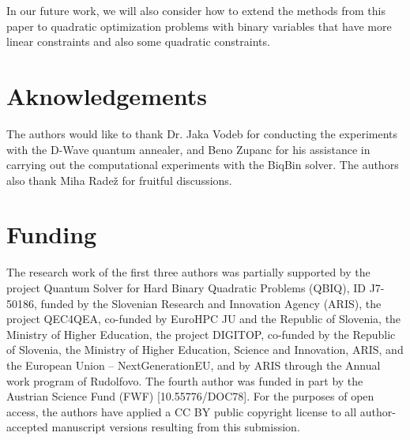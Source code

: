 \documentclass{article}
\begin{document}
In our future work, we will also consider how to extend the methods from this paper to quadratic optimization problems with binary variables that have more linear constraints and also some quadratic constraints.


\section*{Aknowledgements}
The authors would like to thank Dr. Jaka Vodeb for conducting the experiments with the D-Wave quantum annealer, and Beno Zupanc for his assistance in carrying out the computational experiments with the BiqBin solver. The authors also thank Miha Rade\v{z} for fruitful discussions.


\section*{Funding} The research work of the first three authors was partially supported by the project Quantum Solver for Hard Binary Quadratic Problems (QBIQ), ID J7-50186,  funded by the Slovenian Research and Innovation Agency (ARIS), the project QEC4QEA, co-funded by EuroHPC JU and the Republic of Slovenia, the Ministry of Higher Education, the project DIGITOP, co-funded by the Republic of Slovenia, the Ministry of Higher Education, 
Science and Innovation, ARIS, and the European Union – 
NextGenerationEU, and by ARIS through the 
Annual work program of Rudolfovo. The fourth author was funded in part  by the Austrian Science Fund (FWF) [10.55776/DOC78]. For the purposes of open access, the authors have applied a CC BY public copyright license to all author-accepted manuscript versions resulting from this submission.


 
%  

\end{document}
